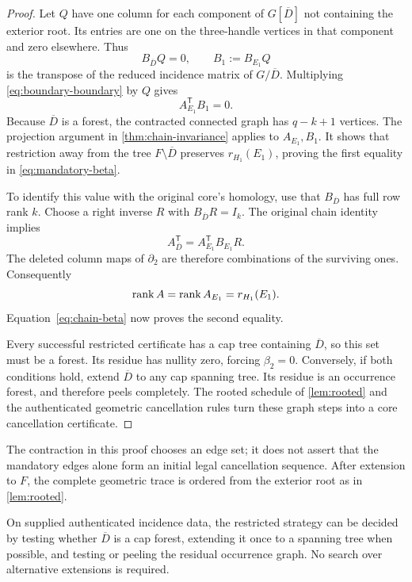 \begin{proof}
Let $Q$ have one column for each component of $G[\overline D]$ not
containing the exterior root. Its entries are one on the three-handle
vertices in that component and zero elsewhere. Thus
\[
 B_{\overline D}Q=0,\qquad B_1:=B_{E_1}Q
\]
is the transpose of the reduced incidence matrix of $G/\overline D$.
Multiplying \cref{eq:boundary-boundary} by $Q$ gives
\begin{equation}
 A_{E_1}^{\mathsf T}B_1=0.
 \label{eq:contracted-chain}
\end{equation}
Because $\overline D$ is a forest, the contracted connected graph has
$q-k+1$ vertices. The projection argument in
\cref{thm:chain-invariance} applies to $A_{E_1},B_1$. It shows that
restriction away from the tree $F\setminus\overline D$ preserves
$r_{H_1}(E_1)$, proving the first equality in \cref{eq:mandatory-beta}.

To identify this value with the original core's homology, use that
$B_{\overline D}$ has full row rank $k$. Choose a right inverse $R$ with
$B_{\overline D}R=I_k$. The original chain identity implies
\[
 A_{\overline D}^{\mathsf T}
     =A_{E_1}^{\mathsf T}B_{E_1}R.
\]
The deleted column maps of $\partial_2$ are therefore combinations of the
surviving ones. Consequently
\[
 \operatorname{rank} A=\operatorname{rank} A_{E_1}=r_{H_1}(E_1).
\]
Equation~\eqref{eq:chain-beta} now proves the second equality.

Every successful restricted certificate has a cap tree containing
$\overline D$, so this set must be a forest. Its residue has nullity zero,
forcing $\beta_2=0$. Conversely, if both conditions hold, extend
$\overline D$ to any cap spanning tree. Its residue is an occurrence
forest, and therefore peels completely. The rooted schedule of
\cref{lem:rooted} and the authenticated geometric cancellation rules turn
these graph steps into a core cancellation certificate.
\end{proof}

The contraction in this proof chooses an edge set; it does not assert that
the mandatory edges alone form an initial legal cancellation sequence.
After extension to $F$, the complete geometric trace is ordered from the
exterior root as in \cref{lem:rooted}.

\begin{corollary}
\label{cor:single-extension}
On supplied authenticated incidence data, the restricted strategy can be
decided by testing whether $\overline D$ is a cap forest, extending it once
to a spanning tree when possible, and testing or peeling the residual
occurrence graph. No search over alternative extensions is required.
\end{corollary}

